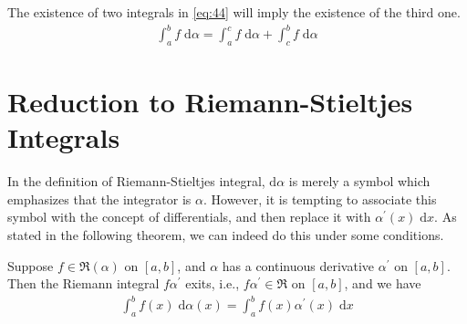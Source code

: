 \documentclass[thmcnt=section, 12pt]{my-elegantbook}
\begin{document}
\begin{theorem} \label{thm:25}
    The existence of two integrals in \eqref{eq:44} will imply the existence of the third one.
    \begin{align}
        \int_a^b f \; \mathrm{d}\alpha
        = \int_a^c f \; \mathrm{d}\alpha
        + \int_c^b f \; \mathrm{d}\alpha
        \label{eq:44}
    \end{align}
\end{theorem}


\section{Reduction to Riemann-Stieltjes Integrals}

\par In the definition of Riemann-Stieltjes integral, $\mathrm{d} \alpha$ is merely a symbol which emphasizes that the integrator is $\alpha$. However, it is tempting to associate this symbol with the concept of differentials, and then replace it with $\alpha^\prime(x) \; \mathrm{d} x$. As stated in the following theorem, we can indeed do this under some conditions.

\begin{theorem} \label{thm:23}
    Suppose $f \in \mathfrak{R}(\alpha)$ on $[a, b]$, and $\alpha$ has a continuous derivative $\alpha^\prime$ on $[a, b]$. Then the Riemann integral $f \alpha^\prime$ exits, i.e., $f \alpha^\prime \in \mathfrak{R}$ on $[a, b]$, and we have 
    \begin{align}
        \int_{a}^{b} f(x) \; \mathrm{d}\alpha(x)
        = \int_{a}^{b} f(x) \alpha^\prime(x) \; \mathrm{d}x
        \label{eq:38}
    \end{align}
\end{theorem}
\end{document}
